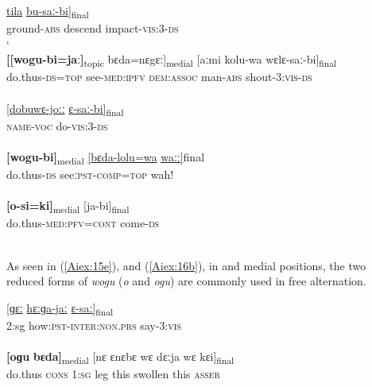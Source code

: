 \documentclass[output=paper]{LSP/langsci}
\begin{document}
\begin{exe}
\ex \label{Aiex:15ae}
\begin{xlist}
\ex \label{Aiex:15a}
\gll \underline{\smash{[isa-jaː}}	\underline{tila}	\underline{bu-saː-bi}]\textsubscript{final}\\
ground-\textsc{abs}	descend	impact-\textsc{vis:3-ds}\\
\glt	‘‎\\
\ex \label{Aiex:15b}
\gll	\textbf{[[wogu-bi=jaː]}\textsubscript{topic}	bɛda=nɛgɛː]\textsubscript{medial}	[aːmi	kolu-wa	wɛlɛ-saː-bi]\textsubscript{final}\\
do.thus-\textsc{ds=top}	see-\textsc{med:ipfv}	\textsc{dem:assoc}	man-\textsc{abs}	shout-\textsc{3:vis-ds}\\
\glt	{}\\
\ex \label{Aiex:15c}
\gll	\underline{[dobuwɛ-joːː}	\underline{ɛ-saː-bi]}\textsubscript{final}\\
\textsc{name-voc}	do-\textsc{vis:3-ds}\\
\glt	{}\\
\ex \label{Aiex:15d}
\gll	\textbf{[wogu-bi]}\textsubscript{medial}	\underline{[bɛda-lolu=wa}	\underline{waːː]}{final}\\
do.thus-\textsc{ds}	see\textsc{ːpst-comp=top}	wah!\\
\glt	{}\\
\ex \label{Aiex:15e}
\gll	\textbf{[o-si=ki]}\textsubscript{medial}	[ja-bi]\textsubscript{final}\\
do.thus\textsc{-med:pfv=cont}	come-\textsc{ds}\\
\glt	{}\\
\end{xlist}
\end{exe}

As seen in (\ref{Aiex:15e}), and (\ref{Aiex:16b}), in  and medial positions, the two reduced forms of \textit{wogu} (\textit{o} and \textit{ogu}) are commonly used in free alternation.

\begin{exe}
\ex \label{Aiex:16ab}
\begin{xlist}
\ex \label{Aiex:16a}
\gll \underline{[ɡɛː}	\underline{hɛːɡa-jaː}	\underline{ɛ-saː]}\textsubscript{final}\\
\textsc{2}:sg	how\textsc{:pst-inter:non.prs}	say-\textsc{3:vis}\\
\glt {}\\
\ex \label{Aiex:16b}
\gll \textbf{[oɡu}	\textbf{bɛda]}\textsubscript{medial}	[nɛ	ɛnɛbɛ	wɛ	dɛːja	wɛ	kɛi]\textsubscript{final}\\
do.thus	\textsc{cons}	\textsc{1:sg}	leg	this	swollen	this	\textsc{asser}\\
\glt {}\\
\end{xlist}
\end{exe}
\end{document}
